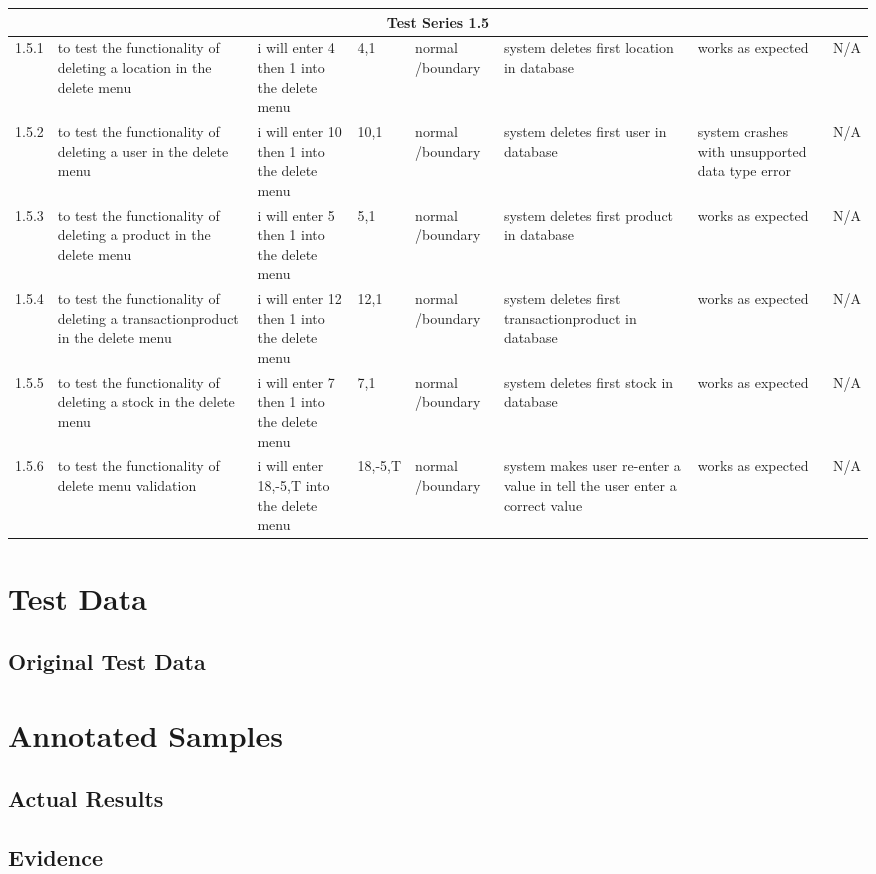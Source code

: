 \begin{landscape}
\begin{center}
\begin{longtable}{|p{1.5cm}|p{2.5cm}|p{2.5cm}|p{2cm}|p{2cm}|p{2cm}|p{2cm}|p{2cm}|}
\multicolumn{8}{c}{Test Series 1.5}\\ \hline
1.5.1 & to test the functionality of deleting a location in the delete menu & i will enter 4 then 1 into the delete menu & 4,1 & normal /boundary & system deletes first location in database & works as expected & N/A \\ \hline
1.5.2 & to test the functionality of deleting a user in the delete menu & i will enter 10 then 1 into the delete menu & 10,1 & normal /boundary & system deletes first user in database & system crashes with unsupported data type error & N/A \\ \hline
1.5.3 & to test the functionality of deleting a product in the delete menu & i will enter 5 then 1 into the delete menu & 5,1 & normal /boundary & system deletes first product in database & works as expected & N/A \\ \hline
1.5.4 & to test the functionality of deleting a transactionproduct in the delete menu & i will enter 12 then 1 into the delete menu & 12,1 & normal /boundary & system deletes first transactionproduct in database & works as expected & N/A \\ \hline
1.5.5 & to test the functionality of deleting a stock in the delete menu & i will enter 7 then 1 into the delete menu & 7,1 & normal /boundary & system deletes first stock in database & works as expected & N/A \\ \hline
1.5.6 & to test the functionality of delete menu validation & i will enter 18,-5,T into the delete menu & 18,-5,T & normal /boundary & system makes user re-enter a value in tell the user enter a correct value & works as expected & N/A \\ \hline


    \end{longtable}
\end{center}

\section{Test Data}

\subsection{Original Test Data}

\section{Annotated Samples}

\subsection{Actual Results}

\subsection{Evidence}

\end{landscape}

